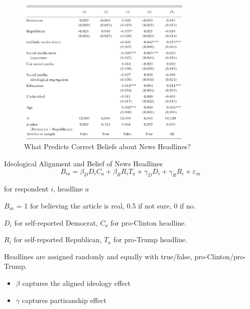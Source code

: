 \documentclass[
  10pt,
  ignorenonframetext,
  aspectratio=43,
]{beamer}
\providecommand{\tightlist}{%
  \setlength{\itemsep}{0pt}\setlength{\parskip}{0pt}}
\begin{document}
\begin{frame}
\begin{figure}
\centering
\includegraphics[width=0.75\textwidth,height=\textheight]{20220315-allcott-gentzkow-2016-election-fake-news.assets/image-20220314152113796.png}
\caption{What Predicts Correct Beliefs about News Headlines?}
\end{figure}
\end{frame}

\begin{frame}{Ideological Alignment and Belief of News Headlines}
\protect\hypertarget{ideological-alignment-and-belief-of-news-headlines}{}
\[
B_{i a}=\beta_{D} D_{i} C_{a}+\beta_{R} R_{i} T_{a}+\gamma_{D} D_{i}+\gamma_{R} R_{i}+\varepsilon_{i a}
\]

for respondent \(i\), headline \(a\)

\(B_{i a}\) = 1 for believing the article is real, 0.5 if not sure, 0 if
no.

\(D_i\) for self-reported Democrat, \(C_a\) for pro-Clinton headline.

\(R_i\) for self-reported Republican, \(T_a\) for pro-Trump headline.

Headlines are assigned randomly and equally with true/false,
pro-Clinton/pro-Trump.

\begin{itemize}
\tightlist
\item
  \(\beta\) captures the aligned ideology effect
\item
  \(\gamma\) captures partisanship effect
\end{itemize}
\end{frame}
\end{document}
